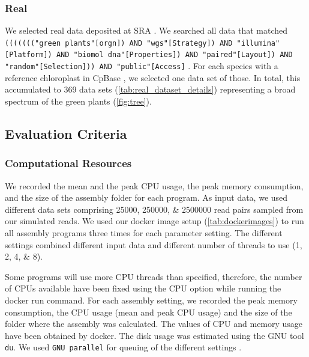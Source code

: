 \documentclass{bmcart}
\begin{document}

\subsubsection*{Real}
We selected real data deposited at SRA \cite{sra2010}.
We searched all data that matched  \texttt{((((((("green plants"[orgn]) AND "wgs"[Strategy]) AND "illumina"[Platform]) AND "biomol dna"[Properties]) AND "paired"[Layout]) AND "random"[Selection])) AND "public"[Access]} \cite{sra_search_term}. 
For each species with a reference chloroplast in CpBase \cite{cpbase}, we selected one data set of those.
In total, this accumulated to \num{369} data sets (\cref{tab:real_dataset_details}) representing a broad spectrum of the green plants (\cref{fig:tree}).

\subsection*{Evaluation Criteria}
\subsubsection*{Computational Resources}
We recorded the mean and the peak CPU usage, the peak memory consumption, and the size of the assembly folder for each program. 
As input data, we used different data sets comprising \numlist{25000;250000;2500000} read pairs sampled from  our simulated reads.
We used our docker image setup (\cref{tab:dockerimages}) to run all assembly programs three times for each parameter setting.
The different settings combined different input data and different number of threads to use (\numlist{1;2;4;8}).

Some programs will use more CPU threads than specified, therefore, the number of CPUs available have been fixed using the CPU option while running the docker run command.
For each assembly setting, we recorded the peak memory consumption, the CPU usage (mean and peak CPU usage) and the size of the folder where the assembly was calculated.
The values of CPU and memory usage have been obtained by docker.
The disk usage was estimated using the GNU tool \texttt{du}.
We used \texttt{GNU parallel} for queuing of the different settings \cite{Tange2011a}.
\end{document}
